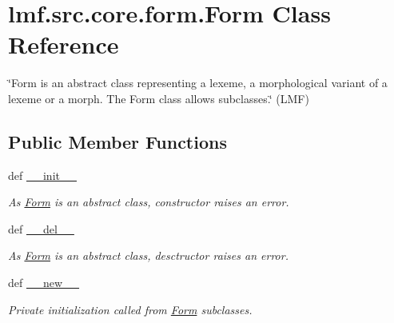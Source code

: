 \hypertarget{classlmf_1_1src_1_1core_1_1form_1_1_form}{\section{lmf.\+src.\+core.\+form.\+Form Class Reference}
\label{classlmf_1_1src_1_1core_1_1form_1_1_form}
}


\char`\"{}\+Form is an abstract class representing a lexeme, a morphological variant of a lexeme or a morph. The Form class allows subclasses.\char`\"{} (L\+M\+F)  


\subsection*{Public Member Functions}
\begin{DoxyCompactItemize}
\item 
def \hyperlink{classlmf_1_1src_1_1core_1_1form_1_1_form_a5d8193e2ae85d0844470137d14504ae1}{\+\_\+\+\_\+init\+\_\+\+\_\+}
\begin{DoxyCompactList}\small\item\em As \hyperlink{classlmf_1_1src_1_1core_1_1form_1_1_form}{Form} is an abstract class, constructor raises an error. \end{DoxyCompactList}\item 
def \hyperlink{classlmf_1_1src_1_1core_1_1form_1_1_form_a4efc5b5afe396103742f2be36f3ada35}{\+\_\+\+\_\+del\+\_\+\+\_\+}
\begin{DoxyCompactList}\small\item\em As \hyperlink{classlmf_1_1src_1_1core_1_1form_1_1_form}{Form} is an abstract class, desctructor raises an error. \end{DoxyCompactList}\item 
def \hyperlink{classlmf_1_1src_1_1core_1_1form_1_1_form_a6b5179aebc5f1a51875d3cc5301c6f84}{\+\_\+\+\_\+new\+\_\+\+\_\+}
\begin{DoxyCompactList}\small\item\em Private initialization called from \hyperlink{classlmf_1_1src_1_1core_1_1form_1_1_form}{Form} subclasses. \end{DoxyCompactList}\end{DoxyCompactItemize}
